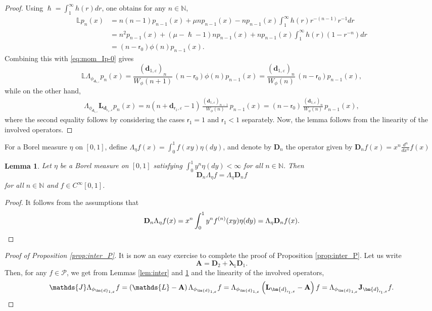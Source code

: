 \documentclass[JEP,XML,SOM,Unicode]{cedram}
\let\epsilon\varepsilon
\theoremstyle{plain}
\newtheorem{lemma}[theorem]{Lemma}
\theoremstyle{definition}
\newcommand{\N}{\mathbb{N}}
\newcommand{\Poly}{\mathscr{P}}
\newcommand{\calL}{\mathds{L}}
\newcommand{\calLd}{\mathbf{L}}
\newcommand{\calJ}{\mathds{J}}
\newcommand{\calJd}{\mathbf{J}}
\newcommand{\dpt}{\bm{d}_{\vat,\epsilon}}
\newcommand{\dz}{{\bm{d}}_{1,\epsilon}}
\newcommand{\lam}{{\bm{\lambda}_1}}
\newcommand{\tet}{{\mathsf{r}_0}}
\newcommand{\vat}{{\mathsf{r}_1}}
\let\h\hslash
\let\mo\mu
\begin{document}
\begin{proof}
Using $\h = \int_1^\infty h(r)dr$, one obtains for any $n\in \N$,
\begin{align*}
\calL p_n(x) &= n(n-1)p_{n-1}(x)+ \mo n p_{n-1}(x)-np_{n-1}(x)\int_1^\infty h(r) r^{-(n-1)} r^{-1}dr \nonumber \\
&= n^2 p_{n-1}(x) + (\mo-\h-1)np_{n-1}(x)+np_{n-1}(x)\int_1^\infty h(r) (1-r^{-n}) dr \nonumber \\
&= (n-\tet)\phi(n)p_{n-1}(x).
\end{align*}
Combining this with \eqref{eq:mom_Ip-0} gives
\begin{equation*}
\calL \Lambda_{\phi_{\dz}}p_n(x) = \frac{(\dz)_n}{W_{\phi}(n+1)}\, (n-\tet)\phi(n) p_{n-1}(x) = \frac{(\dz)_n}{W_{\phi}(n)}\, (n-\tet)p_{n-1}(x),
\end{equation*}
while on the other hand,
\begin{align*}
\Lambda_{\phi_{\dz}} \calLd_{\dpt} p_n(x) = n(n+\dpt-1)\,\frac{(\dz)_{n-1}}{W_{\phi}(n)}\, p_{n-1}(x) = (n-\tet)\,\frac{(\dz)_n}{W_{\phi}(n)}\,p_{n-1}(x),
\end{align*}
where the second equality follows by considering the cases $\vat=1$ and $\vat < 1$ separately. Now, the lemma
follows from the linearity of the involved operators.
\end{proof}

For a Borel measure $\eta$ on $[0,1]$, define $\Lambda_{\eta}f(x)=\int_{0}^{1}f(xy)\eta(dy)$, and denote by $\mathbf{D}_n$ the operator given by $\mathbf{D}_n f(x) = x^n \frac{d^n}{dx^n} f(x)$

\begin{lemma} \label{lem:op-com}
Let $\eta$ be a Borel measure on $[0,1]$ satisfying
$\int_{0}^{1}y^n \eta(dy)<\infty$ for all $n \in \mathbb{N}$.
Then
\begin{equation*}
\mathbf{D}_{n} \Lambda_{\eta} f = \Lambda_{\eta} \mathbf{D}_{n} f
\end{equation*}
for all $n\in \N$ and $f \in C^\infty[0,1]$.
\end{lemma}

\begin{proof}
It follows from the assumptions that
\[
\mathbf{D}_{n} \Lambda_{\eta} f(x) = x^n \int_0^1 y^n f^{(n)}(xy) \eta (dy) = \Lambda_{\eta} \mathbf{D}_{n} f(x).\qedhere
\]
\end{proof}

\begin{proof}[Proof of Proposition \ref{prop:inter_P}]
It is now an easy exercise to complete the proof of Proposition \ref{prop:inter_P}. Let us write
\begin{equation*}
\mathbf{A}= \mathbf{D}_{2}+ \lam \mathbf{D}_{1}.
\end{equation*}
Then, for any $f \in \Poly$, we get from Lemmas \ref{lem:inter} and \ref{lem:op-com}
and the linearity of the involved operators,
\begin{equation*}
\calJ \Lambda_{\phi_{\dz}} f = \left( \calL -\mathbf{A}\right) \Lambda_{\phi_{\dz}}f = \Lambda_{\phi_{\dz}}\left( \calLd_{\dpt} -\mathbf{A}\right) f
= \Lambda_{\phi_{\dz}} \calJd_{\dpt} f.\qedhere
\end{equation*}
\end{proof}
\end{document}
